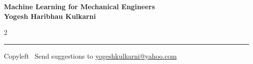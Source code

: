 \documentclass[8pt,landscape]{article}
\begin{document}
\footnotesize

\begin{center}
\Large{\textbf{Machine Learning for Mechanical Engineers\\ Yogesh Haribhau Kulkarni}}
\end{center}

\begin{multicols}{2}

\end{multicols}

\rule{\linewidth}{0.25pt}
\scriptsize
Copyleft \textcopyleft\  Send suggestions to
\href{http://www.yogeshkulkarni.com}{yogeshkulkarni@yahoo.com}
\end{document}
